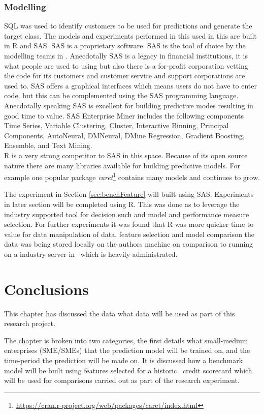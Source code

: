 \subsubsection{Modelling}
SQL was used to identify customers to be used for predictions and generate the target class.
The models and experiments performed in this used in this are built in R and SAS. SAS is a proprietary software. SAS is the tool of choice by the modelling teams in \subjectname. Anecdotally SAS is a legacy in financial institutions, it is what people are used to using but also there is a for-profit corporation vetting the code for its customers and customer service and support corporations are used to. SAS offers a graphical interfaces which means users do not have to enter code, but this can be complemented using the SAS programming language. Anecdotally speaking SAS is excellent for building predictive modes resulting in good time to value. SAS Enterprise Miner includes the following components Time Series, Variable Clustering, Cluster, Interactive Binning, Principal Components, AutoNeural, DMNeural, DMine Regression, Gradient Boosting, Ensemble, and Text Mining.
\\
R is a very strong competitor to SAS in this space. Because of its open source nature there are many libraries available for building predictive models. For example one popular package \textit{caret}\footnote{{\url{https://cran.r-project.org/web/packages/caret/index.html}}} contains many models and continues to grow.

The experiment in Section \ref{sec:benchFeature} will built using SAS. Experiments in later section will be completed using R. This was done as to leverage the industry supported tool for decision such and model and performance measure selection. For further experiments it was found that R was more quicker time to value for data manipulation of data, feature selection and model comparison the data was being stored locally on the authors machine on comparison to running on a industry server in \subjectname\ which is heavily administrated.  


\section{Conclusions}\label{desConc}
This chapter has discussed the data what data will be used as part of this research project. 

The chapter is broken into two categories, the first details what small-medium enterprises (SME/SMEs) that the prediction model will be trained on, and the time-period the prediction will be made on. It is discussed how a benchmark model will be built using features selected for a historic \subjectname\ credit scorecard which will be used for comparisons carried out as part of the research experiment.

